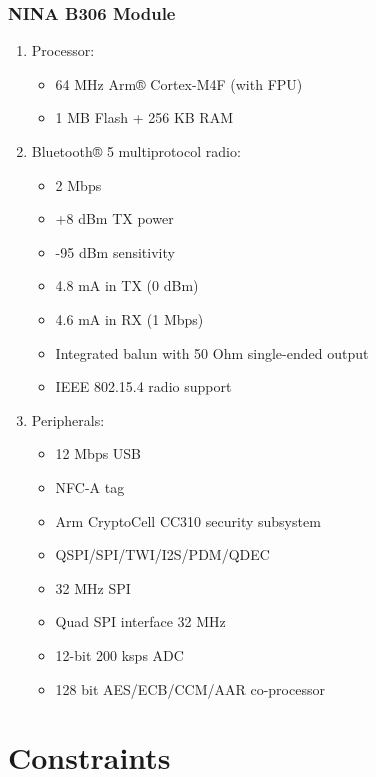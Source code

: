 \subsubsection*{NINA B306 Module}
\begin{enumerate}[label=\arabic*.]
	\item Processor:
	\begin{itemize}[label=-]
		\item 64 MHz Arm® Cortex-M4F (with FPU)
		\item 1 MB Flash + 256 KB RAM
	\end{itemize}
	\item Bluetooth® 5 multiprotocol radio:
	\begin{itemize}[label=-]
		\item 2 Mbps
		\item +8 dBm TX power
		\item -95 dBm sensitivity
		\item 4.8 mA in TX (0 dBm)
		\item 4.6 mA in RX (1 Mbps)
		\item Integrated balun with 50 Ohm single-ended output
		\item IEEE 802.15.4 radio support
	\end{itemize}
	\item Peripherals:
	\begin{itemize}[label=-]
		\item 12 Mbps USB
		\item NFC-A tag
		\item Arm CryptoCell CC310 security subsystem
		\item QSPI/SPI/TWI/I2S/PDM/QDEC
		\item 32 MHz SPI
		\item Quad SPI interface 32 MHz
		\item 12-bit 200 ksps ADC
		\item 128 bit AES/ECB/CCM/AAR co-processor
	\end{itemize}
\end{enumerate}

\section{Constraints}
